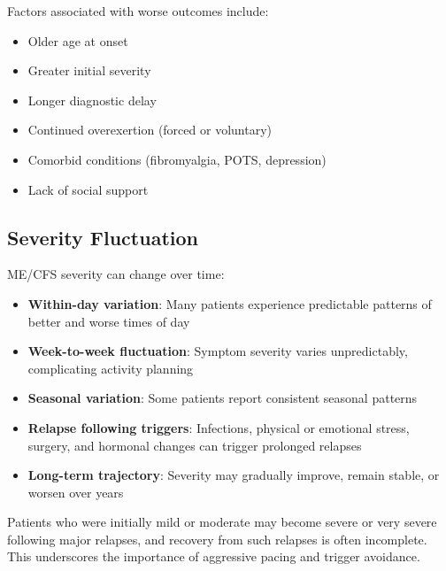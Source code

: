 Factors associated with worse outcomes include:
\begin{itemize}
    \item Older age at onset
    \item Greater initial severity
    \item Longer diagnostic delay
    \item Continued overexertion (forced or voluntary)
    \item Comorbid conditions (fibromyalgia, POTS, depression)
    \item Lack of social support
\end{itemize}

\subsection{Severity Fluctuation}
\label{subsec:fluctuation}

ME/CFS severity can change over time:
\begin{itemize}
    \item \textbf{Within-day variation}: Many patients experience predictable patterns of better and worse times of day
    \item \textbf{Week-to-week fluctuation}: Symptom severity varies unpredictably, complicating activity planning
    \item \textbf{Seasonal variation}: Some patients report consistent seasonal patterns
    \item \textbf{Relapse following triggers}: Infections, physical or emotional stress, surgery, and hormonal changes can trigger prolonged relapses
    \item \textbf{Long-term trajectory}: Severity may gradually improve, remain stable, or worsen over years
\end{itemize}

Patients who were initially mild or moderate may become severe or very severe following major relapses, and recovery from such relapses is often incomplete. This underscores the importance of aggressive pacing and trigger avoidance.

